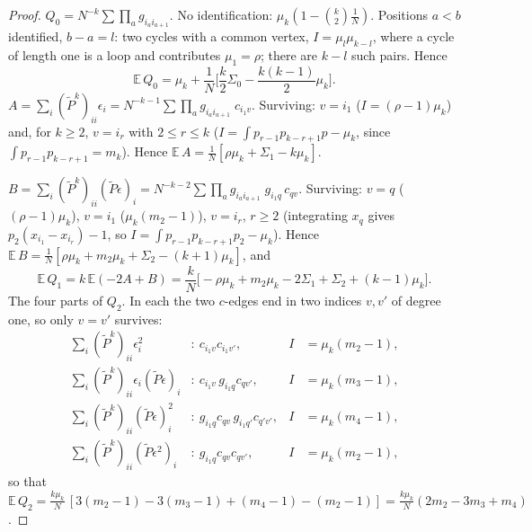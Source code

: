 \begin{proof}
\smallskip\noindent$Q_0=N^{-k}\sum\prod_ag_{i_ai_{a+1}}$. No identification: $\mu_k(1-\binom k2\frac1N)$. Positions $a<b$ identified, $b-a=l$: two cycles with a common vertex, $I=\mu_l\mu_{k-l}$, where a cycle of length one is a loop and contributes $\mu_1=\rho$; there are $k-l$ such pairs. Hence
\[
\mathbb E\,Q_0=\mu_k+\frac1N\Big[\frac k2\Sigma_0-\frac{k(k-1)}2\mu_k\Big].
\]
\noindent$A=\sum_i(\tilde P^k)_{ii}\epsilon_i=N^{-k-1}\sum\prod_ag_{i_ai_{a+1}}\;c_{i_1v}$. Surviving: $v=i_1$ ($I=(\rho-1)\mu_k$) and, for $k\ge2$, $v=i_r$ with $2\le r\le k$ ($I=\int p_{r-1}p_{k-r+1}p-\mu_k$, since $\int p_{r-1}p_{k-r+1}=m_k$). Hence $\mathbb E\,A=\frac1N[\rho\mu_k+\Sigma_1-k\mu_k]$.

\noindent$B=\sum_i(\tilde P^k)_{ii}(\tilde P\epsilon)_i=N^{-k-2}\sum\prod_ag_{i_ai_{a+1}}\;g_{i_1q}\,c_{qv}$. Surviving: $v=q$ ($(\rho-1)\mu_k$), $v=i_1$ ($\mu_k(m_2-1)$), $v=i_r$, $r\ge2$ (integrating $x_q$ gives $p_2(x_{i_1}-x_{i_r})-1$, so $I=\int p_{r-1}p_{k-r+1}p_2-\mu_k$). Hence $\mathbb E\,B=\frac1N[\rho\mu_k+m_2\mu_k+\Sigma_2-(k+1)\mu_k]$, and
\[
\mathbb E\,Q_1=k\,\mathbb E(-2A+B)=\frac kN\Big[-\rho\mu_k+m_2\mu_k-2\Sigma_1+\Sigma_2+(k-1)\mu_k\Big].
\]
\noindent The four parts of $Q_2$. In each the two $c$-edges end in two indices $v,v'$ of degree one, so only $v=v'$ survives:
\begin{align*}
\textstyle\sum_i(\tilde P^k)_{ii}\epsilon_i^2&:\ c_{i_1v}c_{i_1v'},&I&=\mu_k(m_2-1),\\
\textstyle\sum_i(\tilde P^k)_{ii}\epsilon_i(\tilde P\epsilon)_i&:\ c_{i_1v}\,g_{i_1q}c_{qv'},&I&=\mu_k(m_3-1),\\
\textstyle\sum_i(\tilde P^k)_{ii}(\tilde P\epsilon)_i^2&:\ g_{i_1q}c_{qv}\,g_{i_1q'}c_{q'v'},&I&=\mu_k(m_4-1),\\
\textstyle\sum_i(\tilde P^k)_{ii}(\tilde P\epsilon^2)_i&:\ g_{i_1q}c_{qv}c_{qv'},&I&=\mu_k(m_2-1),
\end{align*}
so that $\mathbb E\,Q_2=\frac{k\mu_k}N\,[3(m_2-1)-3(m_3-1)+(m_4-1)-(m_2-1)]=\frac{k\mu_k}N(2m_2-3m_3+m_4)$.


\end{proof}

